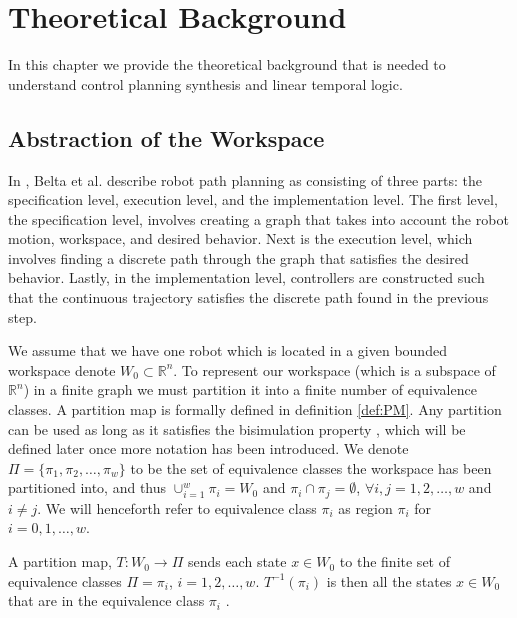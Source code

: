 \chapter{Theoretical Background}
In this chapter we provide the theoretical background that is needed to understand control planning synthesis and linear temporal logic. 
\section{Abstraction of the Workspace}
In \cite{belta07}, Belta et al. describe robot path planning as consisting of three parts: the specification level, execution level, and the implementation level. The first level, the specification level, involves creating a graph that takes into account the robot motion, workspace, and desired behavior. Next is the execution level, which involves finding a discrete path through the graph that satisfies the desired behavior. Lastly, in the implementation level, controllers are constructed such that the continuous trajectory satisfies the discrete path found in the previous step. 

We assume that we have one robot which is located in a given bounded workspace denote $W_0 \subset \mathbb{R}^n$. To represent our workspace (which is a subspace of $\mathbb{R}^n$) in a finite graph we must partition it into a finite number of equivalence classes. A partition map is formally defined in definition \ref{def:PM}. Any partition can be used as long as it satisfies the bisimulation property \cite{belta04}, which will be defined later once more notation has been introduced. We denote $\Pi = \{\pi_1, \pi_2, \dots, \pi_w\}$ to be the set of equivalence classes the workspace has been partitioned into, and thus $\cup_{i=1}^w \pi_i = W_0$ and $\pi_i \cap \pi_j = \emptyset$, $\forall i,j=1,2,\dots,w$ and $i\neq j$. We will henceforth refer to equivalence class $\pi_i$ as region $\pi_i$ for $i = 0,1,\dots, w$. 

\begin{definition}
\label{def:PM}
A partition map, $T: W_0 \rightarrow \Pi$ sends each state $x \in W_0$ to the finite set of equivalence classes $\Pi = {\pi_i}$,  $i = 1,2,\dots ,w$. $T^{-1}(\pi_i)$ is then all the states $x \in W_0$ that are in the equivalence class $\pi_i$ \cite{fainekos05}. 
\end{definition} 

